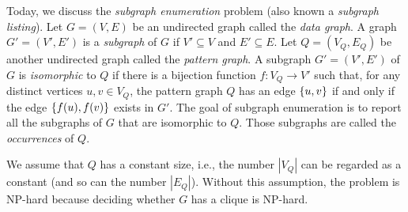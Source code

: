 



\usepackage{wasysym}

\title{}
\author{}
\date{}



\def\bD{\mathbb{D}}
\def\bQ{\mathbb{Q}}

\def\A{\mathcal{A}}
\def\B{\mathcal{B}}
\def\C{\mathcal{C}}
\def\D{\mathcal{D}}
\def\E{\mathcal{E}}
\def\F{\mathcal{F}}
\def\G{\mathcal{G}}
\def\I{\mathcal{I}}
\def\L{\mathcal{L}}
\def\R{\mathcal{R}}
\def\T{\mathcal{T}}

\def\mycycle{\pentagon}
\def\mystar{\star}
\def\supp{\textsc{supp}}

\def\extraspacing{\vspace{3mm} \noindent}
\def\vgap{\vspace{3mm}}
\def\vslit{\vspace{0.5mm}}




Today, we discuss the {\em subgraph enumeration} problem (also known a {\em subgraph listing}). Let $G = (V, E)$ be an undirected graph called the {\em data graph}. A graph $G' = (V', E')$ is a {\em subgraph} of $G$ if $V' \subseteq V$ and $E' \subseteq E$. Let $Q = (V_Q, E_Q)$ be another undirected graph called the {\em pattern graph}. A subgraph $G' = (V', E')$ of $G$ is {\em isomorphic} to $Q$ if there is a bijection function $f: V_Q \rightarrow V'$ such that, for any distinct vertices $u, v \in V_Q$, the pattern graph $Q$ has an edge $\{u, v\}$ if and only if the edge $\{f(u), f(v)\}$ exists in $G'$. The goal of subgraph enumeration is to report all the subgraphs of $G$ that are isomorphic to $Q$. Those subgraphs are called the {\em occurrences} of $Q$.

\vgap

We assume that $Q$ has a constant size, i.e., the number $|V_Q|$ can be regarded as a constant (and so can the number $|E_Q|$). Without this assumption, the problem is NP-hard because deciding whether $G$ has a clique is NP-hard.

